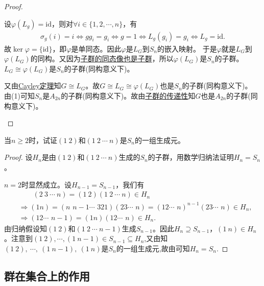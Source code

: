 \documentclass[../../main.tex]{subfiles}%
\begin{document}
\begin{proof}
\begin{enumerate}[(1)]
设$\varphi(L_g)=\mathrm{id}$，则对$\forall i\in\{1,2,\cdots,n\}$，有\begin{align*}
\sigma_g(i)=i\Longleftrightarrow gg_i=g_i\Longleftrightarrow g=1\Longleftrightarrow L_g(g_i)=g_i\Longleftrightarrow L_g=\mathrm{id}.
\end{align*}
故$\ker\varphi=\{\mathrm{id}\}$，即$\varphi$是单同态。因此$\varphi$是$L_G$到$S_n$的嵌入映射。
于是$\varphi$就是$L_G$到$\varphi(L_G)$的同构。又因为\hyperref[theorem:群同态与同构的基本性质-3]{子群的同态像也是子群}，所以$\varphi(L_G)$是$S_n$的子群。$L_G\cong\varphi(L_G)$是$S_n$的子群(同构意义下)。

又由\hyperref[theorem:抽象代数-Cayley定理-定理 1.5.1]{Cayley定理}知$G\cong L_G$。故$G\cong L_G\cong\varphi(L_G)$也是$S_n$的子群(同构意义下)。
由(1)可知$S_n$是$A_{2n}$的子群(同构意义下)。故由\hyperref[proposition:抽象代数---子群的基本性质-0]{子群的传递性}知$G$也是$A_{2n}$的子群(同构意义下)。
\end{enumerate}
\end{proof}

\begin{example}
当$n\geqslant 2$时，试证$(1\ 2)$和$(1\ 2\ \cdots\ n)$是$S_n$的一组生成元。
\end{example}
\begin{proof}
设$H_n$是由$(1\ 2)$和$(1\ 2\ \cdots\ n)$生成的$S_n$的子群，用数学归纳法证明$H_n=S_n$。

$n=2$时显然成立。设$H_{n-1}=S_{n-1}$，我们有
\begin{align*}
&\quad\quad (2\ 3\ \cdots\ n) = (1\ 2)(1\ 2\ \cdots\ n) \in H_n
\\
&\Longrightarrow (1 n)=(n\,\,n-1 \cdots \,\,3 2 1)(2 3 \cdots \,\,n)=(1 2 \cdots \,\,n)^{n-1}(2 3 \cdots \,\,n)\in H_n,
\\
&\Longrightarrow (1 2 \cdots \,\,n-1)=(1 n)(1 2 \cdots \,\,n)\in H_n.
\end{align*}
由归纳假设知$(1\ 2)$和$(1\ 2\ \cdots\ n-1)$生成$S_{n-1}$。因此$H_n \supseteq S_{n-1}$，$(1\ n) \in H_n$。注意到$(1\ 2),\cdots ,(1\ n-1)\in S_{n-1}\subseteq H_n$,又由知$(1\ 2),\ \cdots,\ (1\ n-1),\ (1\ n)$是$S_n$的一组生成元,故由可知$H_n=S_n$.
\end{proof}


\subsection{群在集合上的作用}
\end{document}

